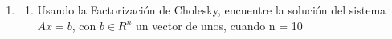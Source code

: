 \documentclass{udpreport}
\begin{document}
\begin{enumerate}
 	\item 
 	 \begin {enumerate}
 	    \item Usando la Factorización de Cholesky, encuentre la solución del sistema $Ax = b$, con $b \in R^{n}$  un vector de unos, cuando n = 10
\end{enumerate}
\end{enumerate}
\end{document}
